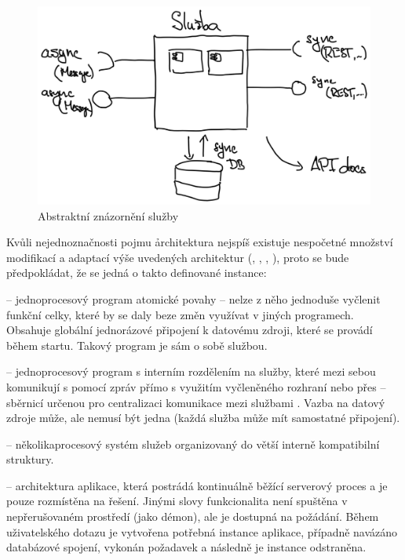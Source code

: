 \begin{figure}[htbp]
   \centering
   \includegraphics[max width=\textwidth]{assets/draft-service}
   \caption{Abstraktní znázornění služby}\label{fig:service-abstract}
\end{figure}


Kvůli nejednoznačnosti pojmu \h{architektura} nejspíš existuje nespočetné množství modifikací a adaptací výše uvedených architektur (, , , ), proto se bude předpokládat, že se jedná o takto definované instance:

\begin{dl}
   \item[\g{MA}] – jednoprocesový program atomické povahy – nelze z něho jednoduše vyčlenit funkční celky, které by se daly beze změn využívat v jiných programech.
   Obsahuje globální jednorázové připojení k datovému zdroji, které se provádí během startu.
   Takový program je sám o sobě službou.
   \item[\g{SOA}] – jednoprocesový program s interním rozdělením na služby, které mezi sebou komunikují s pomocí zpráv přímo s využitím vyčleněného rozhraní nebo přes  – sběrnicí určenou pro centralizaci komunikace mezi službami .
   Vazba na datový zdroje může, ale nemusí být jedna (každá služba může mít samostatné připojení).
   \item[\g{MSA}] – několikaprocesový systém služeb organizovaný do větší interně kompatibilní struktury.
   \item[\g{SA}] – architektura aplikace, která postrádá kontinuálně běžící serverový proces a je pouze rozmístěna na  řešení.
   Jinými slovy funkcionalita není spuštěna v nepřerušovaném prostředí (jako démon), ale je dostupná na požádání.
   Během uživatelského dotazu je vytvořena potřebná instance aplikace, případně navázáno databázové spojení, vykonán požadavek a následně je instance odstraněna.
\end{dl}











